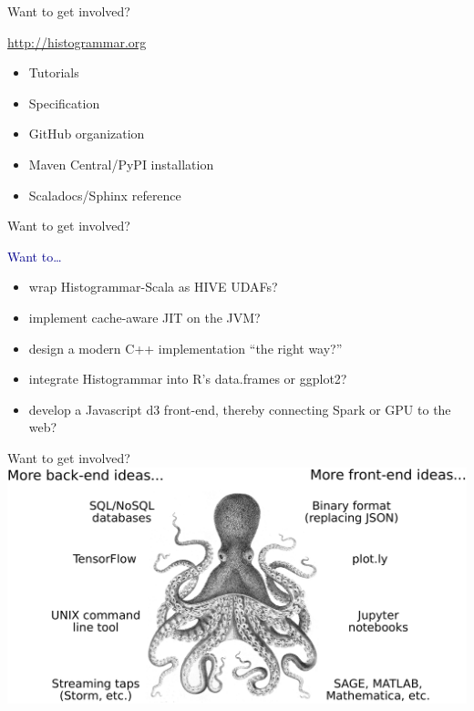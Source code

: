 \documentclass[aspectratio=169]{beamer}
\begin{document}
\begin{frame}{Want to get involved?}
\begin{center}
\begin{minipage}{0.55\linewidth}
\Large
\textcolor{blue}{\url{http://histogrammar.org}}

\begin{itemize}
\item Tutorials
\item Specification
\item GitHub organization
\item Maven Central/PyPI installation
\item Scaladocs/Sphinx reference
\end{itemize}
\end{minipage}
\end{center}
\end{frame}

\begin{frame}{Want to get involved?}
\begin{center}
\begin{minipage}{0.9\linewidth}
\Large
\textcolor{darkblue}{Want to\ldots}
\begin{itemize}\setlength{\itemsep}{0.35 cm}
\item wrap Histogrammar-Scala as HIVE UDAFs?
\item implement cache-aware JIT on the JVM?
\item design a modern C++ implementation ``the right way?''
\item integrate Histogrammar into R's data.frames or ggplot2?
\item develop a Javascript d3 front-end, thereby connecting Spark or GPU to the web?
\end{itemize}
\end{minipage}
\end{center}
\end{frame}

\begin{frame}{Want to get involved?}
\vspace{0.5 cm}
\includegraphics[width=\linewidth]{octopus_ending.pdf}
\end{frame}
\end{document}
